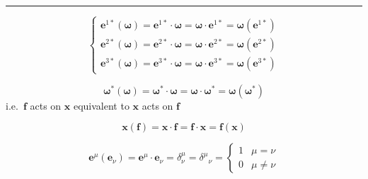 \documentclass[
]{book}
\theoremstyle{definition}
\theoremstyle{definition}
\theoremstyle{definition}
\theoremstyle{definition}
\theoremstyle{remark}
\begin{document}
\begin{center}\rule{0.5\linewidth}{0.5pt}\end{center}

\[
\begin{cases}
\boldsymbol{e}^{{\scriptscriptstyle 1}*}\left(\boldsymbol{\omega}\right)=\boldsymbol{e}^{{\scriptscriptstyle 1}*}\cdot\boldsymbol{\omega}=\boldsymbol{\omega}\cdot\boldsymbol{e}^{{\scriptscriptstyle 1}*}=\boldsymbol{\omega}\left(\boldsymbol{e}^{{\scriptscriptstyle 1}*}\right)\\
\boldsymbol{e}^{{\scriptscriptstyle 2}*}\left(\boldsymbol{\omega}\right)=\boldsymbol{e}^{{\scriptscriptstyle 2}*}\cdot\boldsymbol{\omega}=\boldsymbol{\omega}\cdot\boldsymbol{e}^{{\scriptscriptstyle 2}*}=\boldsymbol{\omega}\left(\boldsymbol{e}^{{\scriptscriptstyle 2}*}\right)\\
\boldsymbol{e}^{{\scriptscriptstyle 3}*}\left(\boldsymbol{\omega}\right)=\boldsymbol{e}^{{\scriptscriptstyle 3}*}\cdot\boldsymbol{\omega}=\boldsymbol{\omega}\cdot\boldsymbol{e}^{{\scriptscriptstyle 3}*}=\boldsymbol{\omega}\left(\boldsymbol{e}^{{\scriptscriptstyle 3}*}\right)
\end{cases}
\]

\[
\boldsymbol{\omega}^{*}\left(\boldsymbol{\omega}\right)=\boldsymbol{\omega}^{*}\cdot\boldsymbol{\omega}=\boldsymbol{\omega}\cdot\boldsymbol{\omega}^{*}=\boldsymbol{\omega}\left(\boldsymbol{\omega}^{*}\right)
\]
i.e.~\(\boldsymbol{f}\) acts on \(\boldsymbol{x}\) equivalent to \(\boldsymbol{x}\) acts on \(\boldsymbol{f}\)

\[
\boldsymbol{x}\left(\boldsymbol{f}\right)=\boldsymbol{x}\cdot\boldsymbol{f}=\boldsymbol{f}\cdot\boldsymbol{x}=\boldsymbol{f}\left(\boldsymbol{x}\right)
\]

\[
\boldsymbol{e}^{{\scriptscriptstyle \mu}}\left(\boldsymbol{e}_{{\scriptscriptstyle \nu}}\right)=\boldsymbol{e}^{{\scriptscriptstyle \mu}}\cdot\boldsymbol{e}_{{\scriptscriptstyle \nu}}=\delta_{{\scriptscriptstyle \nu}}^{{\scriptscriptstyle \mu}}=\delta^{{\scriptscriptstyle \mu}}{}_{{\scriptscriptstyle \nu}}=\begin{cases}
1 & \mu=\nu\\
0 & \mu\ne\nu
\end{cases}
\]
\end{document}

